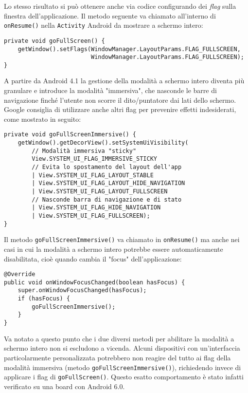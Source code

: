 Lo stesso risultato si può ottenere anche via codice configurando dei \emph{flag} sulla finestra dell'applicazione. Il metodo seguente va chiamato all'interno di \texttt{onResume()} nella \texttt{Activity} Android da mostrare a schermo intero:

\begin{verbatim}
private void goFullScreen() {
    getWindow().setFlags(WindowManager.LayoutParams.FLAG_FULLSCREEN,
                         WindowManager.LayoutParams.FLAG_FULLSCREEN);
}
\end{verbatim}

A partire da Android 4.1 la gestione della modalità a schermo intero diventa più granulare e introduce la modalità "immersiva", che nasconde le barre di navigazione finché l'utente non scorre il dito/puntatore dai lati dello schermo. Google consiglia di utilizzare anche altri flag per prevenire effetti indesiderati\footnotemark, come mostrato in seguito:

\begin{verbatim}
private void goFullScreenImmersive() {
    getWindow().getDecorView().setSystemUiVisibility(
        // Modalità immersiva "sticky"
        View.SYSTEM_UI_FLAG_IMMERSIVE_STICKY
        // Evita lo spostamento del layout dell'app
        | View.SYSTEM_UI_FLAG_LAYOUT_STABLE
        | View.SYSTEM_UI_FLAG_LAYOUT_HIDE_NAVIGATION
        | View.SYSTEM_UI_FLAG_LAYOUT_FULLSCREEN
        // Nasconde barra di navigazione e di stato
        | View.SYSTEM_UI_FLAG_HIDE_NAVIGATION
        | View.SYSTEM_UI_FLAG_FULLSCREEN);
}
\end{verbatim}


Il metodo \texttt{goFullScreenImmersive()} va chiamato in \texttt{onResume()} ma anche nei casi in cui la modalità a schermo intero potrebbe essere automaticamente disabilitata, cioè quando cambia il "focus" dell'applicazione:

\begin{verbatim}
@Override
public void onWindowFocusChanged(boolean hasFocus) {
    super.onWindowFocusChanged(hasFocus);
    if (hasFocus) {
        goFullScreenImmersive();
    }
}
\end{verbatim}

Va notato a questo punto che i due diversi metodi per abilitare la modalità a schermo intero non si escludono a vicenda. Alcuni dispositivi con un'interfaccia particolarmente personalizzata potrebbero non reagire del tutto ai flag della modalità immersiva (metodo \texttt{goFullScreenImmersive()}), richiedendo invece di applicare i flag di \texttt{goFullScreen()}. Questo esatto comportamento è stato infatti verificato su una board con Android 6.0.


